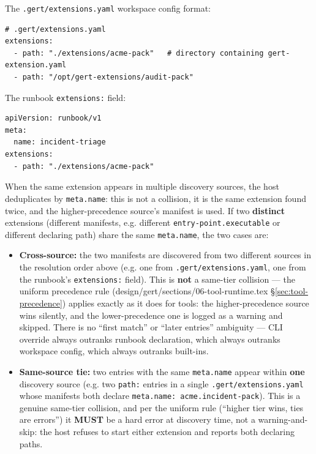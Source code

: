 The \texttt{.gert/extensions.yaml} workspace config format:

\begin{verbatim}
# .gert/extensions.yaml
extensions:
  - path: "./extensions/acme-pack"   # directory containing gert-extension.yaml
  - path: "/opt/gert-extensions/audit-pack"
\end{verbatim}

The runbook \texttt{extensions:} field:

\begin{verbatim}
apiVersion: runbook/v1
meta:
  name: incident-triage
extensions:
  - path: "./extensions/acme-pack"
\end{verbatim}

When the same extension appears in multiple discovery sources, the host
deduplicates by \texttt{meta.name}: this is not a collision, it is the same
extension found twice, and the higher-precedence source's manifest is used.
If two \textbf{distinct} extensions (different manifests, e.g. different
\texttt{entry-point.executable} or different declaring path) share the same
\texttt{meta.name}, the two cases are:

\begin{itemize}
  \item \textbf{Cross-source:} the two manifests are discovered from two
        different sources in the resolution order above (e.g. one from
        \texttt{.gert/extensions.yaml}, one from the runbook's
        \texttt{extensions:} field). This is \textbf{not} a same-tier
        collision --- the uniform precedence rule
        (design/gert/sections/06-tool-runtime.tex \S\ref{sec:tool-precedence})
        applies exactly as it does for tools: the higher-precedence source
        wins silently, and the lower-precedence one is logged as a warning
        and skipped. There is no ``first match'' or ``later entries''
        ambiguity --- CLI override always outranks runbook declaration,
        which always outranks workspace config, which always outranks
        built-ins.
  \item \textbf{Same-source tie:} two entries with the same \texttt{meta.name}
        appear within \textbf{one} discovery source (e.g. two \texttt{path:}
        entries in a single \texttt{.gert/extensions.yaml} whose manifests
        both declare \texttt{meta.name: acme.incident-pack}). This is a
        genuine same-tier collision, and per the uniform rule
        (``higher tier wins, ties are errors'') it \textbf{MUST} be a hard
        error at discovery time, not a warning-and-skip: the host refuses to
        start either extension and reports both declaring paths.
\end{itemize}


